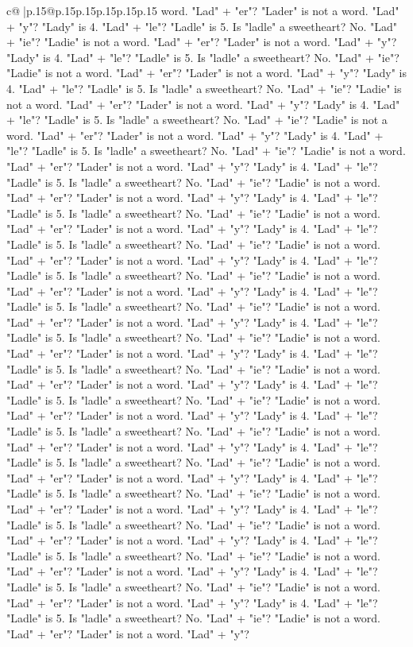\documentclass{article}
\begin{document}
{\begin{supertabular}{c@{$\;$}|p{.15\linewidth}@{}p{.15\linewidth}p{.15\linewidth}p{.15\linewidth}p{.15\linewidth}p{.15\linewidth}}
{{{word. "Lad" + "er"? "Lader" is not a word. "Lad" + "y"? "Lady" is 4. "Lad" + "le"? "Ladle" is 5. Is "ladle" a sweetheart? No. "Lad" + "ie"? "Ladie" is not a word. "Lad" + "er"? "Lader" is not a word. "Lad" + "y"? "Lady" is 4. "Lad" + "le"? "Ladle" is 5. Is "ladle" a sweetheart? No. "Lad" + "ie"? "Ladie" is not a word. "Lad" + "er"? "Lader" is not a word. "Lad" + "y"? "Lady" is 4. "Lad" + "le"? "Ladle" is 5. Is "ladle" a sweetheart? No. "Lad" + "ie"? "Ladie" is not a word. "Lad" + "er"? "Lader" is not a word. "Lad" + "y"? "Lady" is 4. "Lad" + "le"? "Ladle" is 5. Is "ladle" a sweetheart? No. "Lad" + "ie"? "Ladie" is not a word. "Lad" + "er"? "Lader" is not a word. "Lad" + "y"? "Lady" is 4. "Lad" + "le"? "Ladle" is 5. Is "ladle" a sweetheart? No. "Lad" + "ie"? "Ladie" is not a word. "Lad" + "er"? "Lader" is not a word. "Lad" + "y"? "Lady" is 4. "Lad" + "le"? "Ladle" is 5. Is "ladle" a sweetheart? No. "Lad" + "ie"? "Ladie" is not a word. "Lad" + "er"? "Lader" is not a word. "Lad" + "y"? "Lady" is 4. "Lad" + "le"? "Ladle" is 5. Is "ladle" a sweetheart? No. "Lad" + "ie"? "Ladie" is not a word. "Lad" + "er"? "Lader" is not a word. "Lad" + "y"? "Lady" is 4. "Lad" + "le"? "Ladle" is 5. Is "ladle" a sweetheart? No. "Lad" + "ie"? "Ladie" is not a word. "Lad" + "er"? "Lader" is not a word. "Lad" + "y"? "Lady" is 4. "Lad" + "le"? "Ladle" is 5. Is "ladle" a sweetheart? No. "Lad" + "ie"? "Ladie" is not a word. "Lad" + "er"? "Lader" is not a word. "Lad" + "y"? "Lady" is 4. "Lad" + "le"? "Ladle" is 5. Is "ladle" a sweetheart? No. "Lad" + "ie"? "Ladie" is not a word. "Lad" + "er"? "Lader" is not a word. "Lad" + "y"? "Lady" is 4. "Lad" + "le"? "Ladle" is 5. Is "ladle" a sweetheart? No. "Lad" + "ie"? "Ladie" is not a word. "Lad" + "er"? "Lader" is not a word. "Lad" + "y"? "Lady" is 4. "Lad" + "le"? "Ladle" is 5. Is "ladle" a sweetheart? No. "Lad" + "ie"? "Ladie" is not a word. "Lad" + "er"? "Lader" is not a word. "Lad" + "y"? "Lady" is 4. "Lad" + "le"? "Ladle" is 5. Is "ladle" a sweetheart? No. "Lad" + "ie"? "Ladie" is not a word. "Lad" + "er"? "Lader" is not a word. "Lad" + "y"? "Lady" is 4. "Lad" + "le"? "Ladle" is 5. Is "ladle" a sweetheart? No. "Lad" + "ie"? "Ladie" is not a word. "Lad" + "er"? "Lader" is not a word. "Lad" + "y"? "Lady" is 4. "Lad" + "le"? "Ladle" is 5. Is "ladle" a sweetheart? No. "Lad" + "ie"? "Ladie" is not a word. "Lad" + "er"? "Lader" is not a word. "Lad" + "y"? "Lady" is 4. "Lad" + "le"? "Ladle" is 5. Is "ladle" a sweetheart? No. "Lad" + "ie"? "Ladie" is not a word. "Lad" + "er"? "Lader" is not a word. "Lad" + "y"? "Lady" is 4. "Lad" + "le"? "Ladle" is 5. Is "ladle" a sweetheart? No. "Lad" + "ie"? "Ladie" is not a word. "Lad" + "er"? "Lader" is not a word. "Lad" + "y"? "Lady" is 4. "Lad" + "le"? "Ladle" is 5. Is "ladle" a sweetheart? No. "Lad" + "ie"? "Ladie" is not a word. "Lad" + "er"? "Lader" is not a word. "Lad" + "y"? "Lady" is 4. "Lad" + "le"? "Ladle" is 5. Is "ladle" a sweetheart? No. "Lad" + "ie"? "Ladie" is not a word. "Lad" + "er"? "Lader" is not a word. "Lad" + "y"? "Lady" is 4. "Lad" + "le"? "Ladle" is 5. Is "ladle" a sweetheart? No. "Lad" + "ie"? "Ladie" is not a word. "Lad" + "er"? "Lader" is not a word. "Lad" + "y"? }}}
\end{supertabular}}
\end{document}
